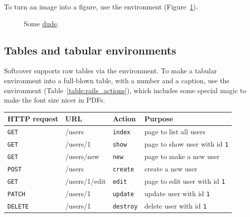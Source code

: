 
To turn an image into a figure, use the  environment (Figure~\ref{fig:the_dude}).

\begin{figure}
\caption{Some \href{http://michaelhartl.com/}{dude}.\label{fig:the_dude}}
\end{figure}

\subsection{Tables and tabular environments}
\label{tables_and_tabular}

Softcover supports raw tables via the  environment. To make a tabular environment into a full-blown table, with a number and a caption, use the  environment (Table~\ref{table:rails_actions}), which includes some special magic to make the font size nicer in PDFs.

\bigskip

\begin{tabular}{llll}
\textbf{HTTP request} & \textbf{URL} & \textbf{Action} & \textbf{Purpose} \\ \hline

\texttt{GET} & /users & \texttt{index} & page to list all users \\
\texttt{GET} & /users/1 & \texttt{show} & page to show user with id \texttt{1}\\
\texttt{GET} & /users/new & \texttt{new} & page to make a new user \\
\texttt{POST} & /users & \texttt{create} & create a new user \\
\texttt{GET} & /users/1/edit & \texttt{edit} & page to edit user with id \texttt{1} \\
\texttt{PATCH} & /users/1 & \texttt{update} & update user with id \texttt{1}  \\
\texttt{DELETE} & /users/1 & \texttt{destroy} & delete user with id \texttt{1}
\end{tabular}

